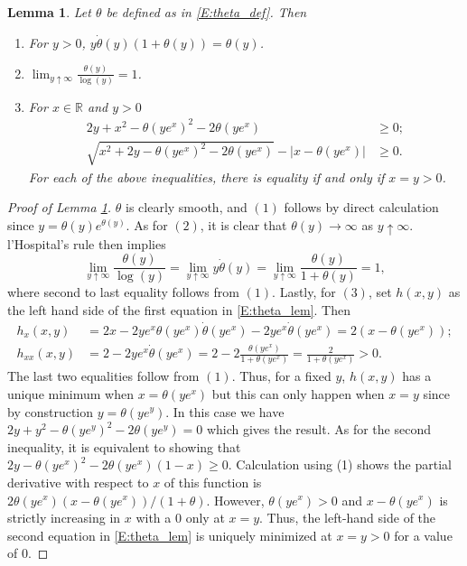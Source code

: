 \documentclass[11pt, letterpaper]{amsart}
\newtheorem{lemma}[theorem]{Lemma}
\theoremstyle{definition}
\theoremstyle{remark}
\numberwithin{equation}{section}
\newcommand{\reals}{\mathbb R}
\begin{document}
\begin{lemma}\label{L:theta_lem}
Let $\theta$ be defined as in \eqref{E:theta_def}. Then
\begin{enumerate}[(1)]
\item For $y>0$, $y\dot{\theta}(y)(1+\theta(y)) = \theta(y)$.
\item $\lim_{y\uparrow\infty} \frac{\theta(y)}{\log(y)} = 1$.
\item For $x\in\reals$ and $y>0$
\begin{equation}\label{E:theta_lem}
\begin{split}
2y + x^2 - \theta(ye^x)^2 - 2\theta(ye^x) &\geq 0;\\
\sqrt{x^2+2y-\theta(ye^x)^2-2\theta(ye^x)} - |x-\theta(ye^x)| &\geq 0.
\end{split}
\end{equation}
For each of the above inequalities, there is equality if and only if $x=y>0$.
\end{enumerate}
\end{lemma}

\begin{proof}[Proof of Lemma \ref{L:theta_lem}]
$\theta$ is clearly smooth, and $(1)$ follows by direct calculation since $ y = \theta(y)e^{\theta(y)}$. As for $(2)$, it is clear that $\theta(y)\rightarrow\infty$ as $y\uparrow\infty$. l'Hospital's rule then implies
\begin{equation*}
\lim_{y\uparrow\infty}\frac{\theta(y)}{\log(y)} = \lim_{y\uparrow\infty} y\dot{\theta}(y) = \lim_{y\uparrow\infty}\frac{\theta(y)}{1+\theta(y)} = 1,
\end{equation*}
where second to last equality follows from $(1)$. Lastly, for $(3)$, set $h(x,y)$ as the left hand side of  the first equation in \eqref{E:theta_lem}. Then
\begin{equation*}
\begin{split}
h_x(x,y) &= 2x - 2ye^{x}\theta(ye^x)\dot{\theta}(ye^x) - 2ye^x \dot{\theta}(ye^x) = 2(x-\theta(ye^x));\\
h_{xx}(x,y) &= 2 - 2ye^x\dot{\theta}(ye^x) = 2 - 2\frac{\theta(ye^x)}{1+\theta(ye^x)} = \frac{2}{1+\theta(ye^x)} > 0.
\end{split}
\end{equation*}
The last two equalities follow from $(1)$. Thus, for a fixed $y$, $h(x,y)$ has a unique minimum when $x = \theta(ye^x)$ but this can only happen when $x = y$ since by construction $y = \theta(ye^y)$.  In this case we have $2y + y^2 - \theta(ye^y)^2 -2\theta(ye^y) = 0$ which gives the result. As for the second inequality, it is equivalent to showing that $2y - \theta(ye^x)^2 - 2\theta(ye^x)(1-x) \geq 0$. Calculation using (1) shows the partial derivative with respect to $x$ of this function is $2\theta(ye^x)(x-\theta(ye^x))/(1+\theta)$. However, $\theta(ye^x) > 0$ and $x-\theta(ye^x)$ is strictly increasing in $x$ with a $0$ only at $x=y$.  Thus, the left-hand side of the second equation in \eqref{E:theta_lem} is uniquely minimized at $x=y>0$ for a value of $0$.

\end{proof}
\end{document}
